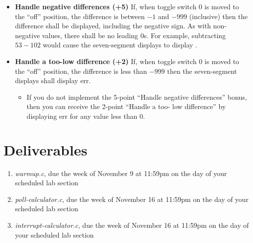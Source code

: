 \documentclass[12pt]{article}
\begin{document}
\begin{itemize}
    \item \textbf{Handle negative differences (+5)} If, when toggle switch 0 is
        moved to the ``off'' position, the difference is between $-1$ and $-
        999$ (inclusive) then the difference shall be displayed, including the
        negative sign. As with non-negative values, there shall be no leading
        $0$s. For example, subtracting $53-102$ would cause the seven-segment
        displays to display {}.
    \item \textbf{Handle a too-low difference (+2)} If, when toggle switch 0 is
        moved to the ``off'' position, the difference is less than $-999$ then
        the seven-segment displays shall display {\dviiseg err}.
    \begin{itemize}
        \item If you do not implement the 5-point ``Handle negative
        differences'' bonus, then you can receive the 2-point ``Handle a too-
        low difference'' by displaying {\dviiseg err} for any value less than
        $0$.
    \end{itemize}
\end{itemize}

\section{Deliverables}

\begin{enumerate}
\item \textit{warmup.c}, due the week of November 9 at 11:59pm on the day of
    your scheduled lab section
\item \textit{poll-calculator.c}, due the week of November 16 at 11:59pm on the
    day of your scheduled lab section
\item \textit{interrupt-calculator.c}, due the week of November 16 at 11:59pm
    on the day of your scheduled lab section
\end{enumerate}
\end{document}
